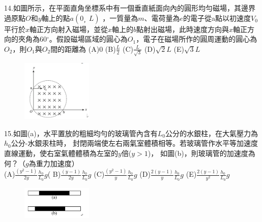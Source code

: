 \documentclass[cn,10pt,math=newtx]{elegantbook}
\begin{document}
\begin{example}
   14.如圖所示，在平面直角坐標系中有一個垂直紙面向內的圓形均勻磁場，其邊界過原點$O$和$y$軸上的點$a(0_，L)$ ，一質量為$m$、電荷量為$e$的電子從a點以初速度$V_0$平行於$x$軸正方向射入磁場，並從$x$軸上的$b$點射出磁場，此時速度方向與$x$軸正方向的夾角為60$^\circ$。假設磁場區域的圓心為$O_1$，電子在磁場所作的圓周運動的圓心為$O_2$，則$O_1$與$O_2$間的距離為
   (A)0 (B)$\frac{L}{2}$ (C)$\frac{L}{\sqrt{3}}$ (D)$\sqrt{2} L$ (E)$\sqrt{3} L$
   \\
    \rightline{[成德高中教甄109]}
\end{example}
\begin{solution}
    
\end{solution}
\begin{figure}[htbp]
    \flushright
    \includegraphics[width=0.3\textwidth]{image/109成德14.png}
  \end{figure}
\newpage


\begin{example}
   15.如圖(a)，水平置放的粗細均勻的玻璃管內含有$L_0$公分的水銀柱，在大氣壓力為$h_0$公分-水銀汞柱時，
   封閉兩端使左右兩氣室體積相等。若玻璃管作水平等加速度直線運動，使右室氣體體積為左室的$y$倍($y>1$)，
   如圖(b)，則玻璃管的加速度為何？（$g$為重力加速度）\\
   (A)$\frac{(y^2 -1)}{2y} \frac{h_0}{L_0} g$( B)$\frac{(y -1)}{2y} \frac{h_0}{L_0} g$ 
   (C)$\frac{(y^2 -1)}{y} \frac{h_0}{L_0} g$ (D)$\frac{2(y -1)}{y} \frac{h_0}{L_0} g$ 
   (E)$\frac{2(y -1)}{y^2} \frac{h_0}{L_0} g$
   \\
    \rightline{[成德高中教甄109]}
\end{example}
\begin{solution}
    
\end{solution}
\begin{figure}[htbp]
    \flushright
    \includegraphics[width=0.3\textwidth]{image/109成德15.png}
  \end{figure}
\newpage
\end{document}
